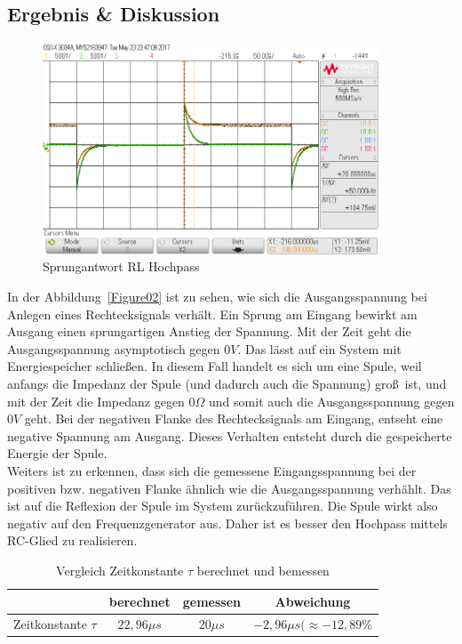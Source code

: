 \documentclass[12pt,a4paper,titlepage]{article}
\begin{document}
\subsection{Ergebnis \& Diskussion}
\begin{figure}[H]
  \centering
  \includegraphics[width=100mm]{sprungantwort_rl_hochpass.png}
  \caption{Sprungantwort RL Hochpass}
  \label{Figure07}
\end{figure}
\noindent In der Abbildung~\ref{Figure02} ist zu sehen, wie sich die Ausgangsspannung bei Anlegen eines Rechtecksignals verh\"alt. Ein Sprung am Eingang bewirkt am Ausgang einen sprungartigen Anstieg der Spannung. Mit der Zeit geht die Ausgangsspannung asymptotisch gegen $0V$. Das l\"asst auf ein System mit Energiespeicher schlie\ss en. In diesem Fall handelt es sich um eine Spule, weil anfangs die Impedanz der Spule (und dadurch auch die Spannung) gro\ss \, ist, und mit der Zeit die Impedanz gegen $0 \Omega$ und somit auch die Ausgangsspannung gegen $0V$ geht. Bei der negativen Flanke des Rechtecksignals am Eingang, entseht eine negative Spannung am Ausgang. Dieses Verhalten entsteht durch die gespeicherte Energie der Spule. \\
Weiters ist zu erkennen, dass sich die gemessene Eingangsspannung bei der positiven bzw. negativen Flanke \"ahnlich wie die Ausgangsspannung verh\"ahlt. Das ist auf die Reflexion der Spule im System zur\"uckzuf\"uhren. Die Spule wirkt also negativ auf den Frequenzgenerator aus. Daher ist es besser den Hochpass mittels RC-Glied zu realisieren.

\begin{table}[H]
\centering
\begin{tabular}{|c|c|c|c|}
\hline
& berechnet    & gemessen    & Abweichung \\ \hline
Zeitkonstante $\tau$ & $22,96 \mu s$  & $20 \mu s$      & $-2,96 \mu s (\approx-12,89 \%$ \\ \hline
\end{tabular}
\caption{Vergleich Zeitkonstante $\tau$ berechnet und bemessen}
\label{Figure03}
\end{table}
\end{document}
